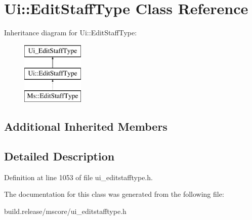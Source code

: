 \hypertarget{class_ui_1_1_edit_staff_type}{}\section{Ui\+:\+:Edit\+Staff\+Type Class Reference}
\label{class_ui_1_1_edit_staff_type}
Inheritance diagram for Ui\+:\+:Edit\+Staff\+Type\+:\begin{figure}[H]
\begin{center}
\leavevmode
\includegraphics[height=3.000000cm]{class_ui_1_1_edit_staff_type}
\end{center}
\end{figure}
\subsection*{Additional Inherited Members}


\subsection{Detailed Description}


Definition at line 1053 of file ui\+\_\+editstafftype.\+h.



The documentation for this class was generated from the following file\+:\begin{DoxyCompactItemize}
\item 
build.\+release/mscore/ui\+\_\+editstafftype.\+h\end{DoxyCompactItemize}
